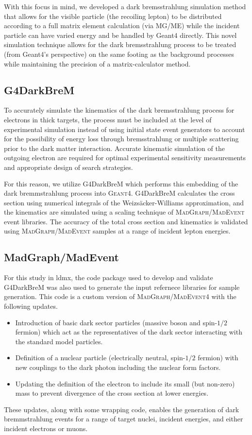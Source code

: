 With this focus in mind, we developed a dark bremsstrahlung simulation method that allows for the
visible particle (the recoiling lepton) to be distributed according to a full matrix element
calculation (via MG/ME) while the incident particle can have varied energy and be handled by Geant4
directly. This novel simulation technique allows for the dark bremsstrahlung process to be treated
(from Geant4's perspective) on the same footing as the background processes while maintaining the
precision of a matrix-calculator method.

\subsection{G4DarkBreM}
To accurately simulate the kinematics of the dark bremsstrahlung process for electrons in thick
targets, the process must be included at the level of experimental simulation instead of using
initial state event generators to account for the possibility of energy loss through bremsstrahlung
or multiple scattering prior to the dark matter interaction. Accurate kinematic simulation of the
outgoing electron are required for optimal experimental sensitivity measurements and appropriate
design of search strategies.

For this reason, we utilize G4DarkBreM \cite{g4darkbrem} which performs this embedding of the dark
bremmstrahlung process into \textsc{Geant}4. G4DarkBreM calculates the cross section using
numerical integrals of the Weizs\"{a}cker-Williams approximation, and the kinematics are simulated
using a scaling technique of \textsc{MadGraph/MadEvent} event libraries. The accuracy of the total
cross section and kinematics is validated using \textsc{MadGraph/MadEvent} samples at a range of
incident lepton energies.

\subsection{MadGraph/MadEvent}
For this study in \ac{ldmx}, the code package used to develop and validate G4DarkBreM was also used
to generate the input refernece libraries for sample generation. This code is a custom version of
\textsc{MadGraph/MadEvent4} with the following updates.
\begin{itemize}
  \item Introduction of basic dark sector particles (massive boson and spin-$1/2$ fermion) which act as the
        representatives of the dark sector interacting with the standard model particles.
  \item Definition of a nuclear particle (electrically neutral, spin-$1/2$ fermion) with new couplings to
        the dark photon including the nuclear form factors.
  \item Updating the definition of the electron to include its small (but non-zero) mass to prevent
        divergence of the cross section at lower energies.
\end{itemize}
These updates, along with some wrapping code, enables the generation of
dark bremmstrahlung events for a range of target nuclei, incident energies,
and either incident electrons or muons.

